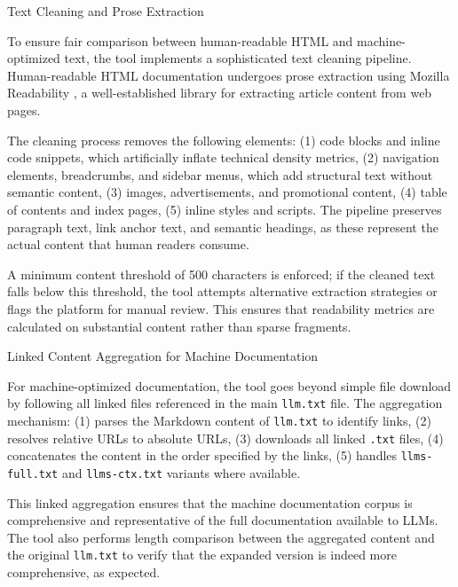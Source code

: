 \documentclass[10pt,conference,a4paper]{IEEEtran}
\makeatletter
\let\oldsubsubsection\subsubsection
\renewcommand{\subsubsection}{%
    \@ifstar{\subsubsectionStar}{\subsubsectionNoStar}%
}
\newcommand{\subsubsectionStar}[1]{%
    \oldsubsubsection*{\textit{#1}}%
}
\newcommand{\subsubsectionNoStar}[1]{%
    \oldsubsubsection{\textit{#1}}%
}
\makeatother
\begin{document}
\subsubsection{Text Cleaning and Prose Extraction}

To ensure fair comparison between human-readable HTML and machine-optimized text, the tool implements a sophisticated text cleaning pipeline. Human-readable HTML documentation undergoes prose extraction using Mozilla Readability \cite{MozillaReadability}, a well-established library for extracting article content from web pages.

The cleaning process removes the following elements: (1) code blocks and inline code snippets, which artificially inflate technical density metrics, (2) navigation elements, breadcrumbs, and sidebar menus, which add structural text without semantic content, (3) images, advertisements, and promotional content, (4) table of contents and index pages, (5) inline styles and scripts. The pipeline preserves paragraph text, link anchor text, and semantic headings, as these represent the actual content that human readers consume.

A minimum content threshold of 500 characters is enforced; if the cleaned text falls below this threshold, the tool attempts alternative extraction strategies or flags the platform for manual review. This ensures that readability metrics are calculated on substantial content rather than sparse fragments.

\subsubsection{Linked Content Aggregation for Machine Documentation}

For machine-optimized documentation, the tool goes beyond simple file download by following all linked files referenced in the main \texttt{llm.txt} file. The aggregation mechanism: (1) parses the Markdown content of \texttt{llm.txt} to identify links, (2) resolves relative URLs to absolute URLs, (3) downloads all linked \texttt{.txt} files, (4) concatenates the content in the order specified by the links, (5) handles \texttt{llms-full.txt} and \texttt{llms-ctx.txt} variants where available.

This linked aggregation ensures that the machine documentation corpus is comprehensive and representative of the full documentation available to LLMs. The tool also performs length comparison between the aggregated content and the original \texttt{llm.txt} to verify that the expanded version is indeed more comprehensive, as expected.
\end{document}

